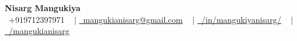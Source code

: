\documentclass[letterpaper,11pt]{article}
\begin{document}
\begin{center}
    {\Huge  \textbf{Nisarg Mangukiya}} \\ \vspace{4pt}
    \small \raisebox{-0.1\height}\faPhone\ +919712397971 ~ $|$ \href{mailto:mangukianisarg@gmail.com}{\raisebox{-0.2\height}\faEnvelope\  \underline{mangukianisarg@gmail.com}} ~ $|$ 
    \href{https://www.linkedin.com/in/mangukiyanisarg/}{\raisebox{-0.2\height}\faLinkedin\ \underline{/in/mangukiyanisarg/}}  ~ $|$
    \href{https://github.com/mangukianisarg}{\raisebox{-0.2\height}\faGithub\ \underline{/mangukianisarg}}
    \vspace{-7pt}
\end{center}



\vspace{5pt}
\end{document}
